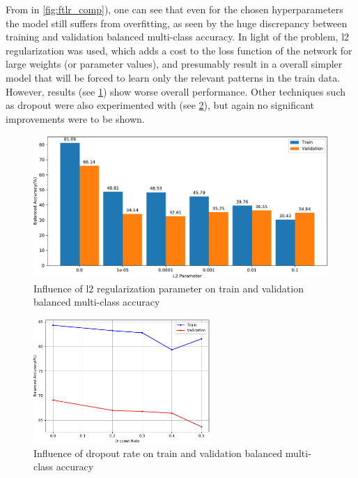     From in \ref{fig:ftlr_comp}), one can see that even for the chosen hyperparameters the model still suffers from overfitting, as seen by the huge discrepancy between training and validation balanced multi-class accuracy. In light of the problem, l2 regularization was used, which adds a cost to the loss function of the network for large weights (or parameter values), and presumably result in a overall simpler model that will be forced to learn only the relevant patterns in the train data. However, results (see \ref{fig:densenet201_lambda_comp}) show worse overall performance. Other techniques such as dropout were also experimented with (see \ref{fig:densenet201_dropout_comp}), but again no significant improvements were to be shown. \par 
    \begin{figure}[ht]
        \centering
        \includegraphics[width=\textwidth]{figs/densenet201_lambda_comp.pdf}
        \caption{Influence of l2 regularization parameter on train and validation balanced multi-class accuracy}
        \label{fig:densenet201_lambda_comp}
    \end{figure}
    
    \begin{figure}[ht]
        \centering
        \includegraphics[width=0.6\textwidth]{figs/densenet201_dropout_comp.pdf}
        \caption{Influence of dropout rate on train and validation balanced multi-class accuracy}
        \label{fig:densenet201_dropout_comp}
    \end{figure}
    

